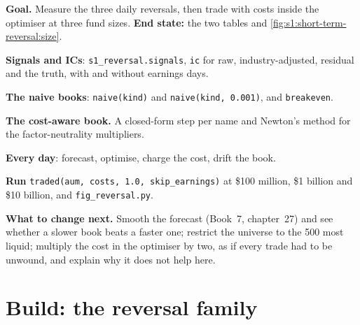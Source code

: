 \begin{tutorial}
\textbf{Goal.} Measure the three daily reversals, then trade  with costs inside the optimiser at three fund sizes. \textbf{End state:} the two
tables and \cref{fig:s1:short-term-reversal:size}.
\begin{tutsteps}
\item \textbf{Signals and ICs}: \texttt{s1\_reversal.signals}, \texttt{ic} for raw, industry-adjusted, residual and the truth, with and without earnings days.
\item \textbf{The naive books}: \texttt{naive(kind)} and \texttt{naive(kind, 0.001)}, and \texttt{breakeven}.
\item \textbf{The cost-aware book.} A closed-form step per name and Newton's method for the factor-neutrality multipliers.
\label{lst:s1:short-term-reversal:book}
\item \textbf{Every day}: forecast, optimise, charge the cost, drift the book.
\label{lst:s1:short-term-reversal:loop}
\item \textbf{Run} \texttt{traded(aum, costs, 1.0, skip\_earnings)} at \$100 million, \$1 billion and \$10 billion, and \texttt{fig\_reversal.py}.
\end{tutsteps}
\textbf{What to change next.} Smooth the forecast (Book~7, chapter~27) and see whether a slower book beats a faster one; restrict the universe to the 500 most
liquid; multiply the cost in the optimiser by two, as if every trade had to be unwound, and explain why it does not help here.
\end{tutorial}

\section{Build: the reversal family}\label{bld:s1:short-term-reversal:reversal}

